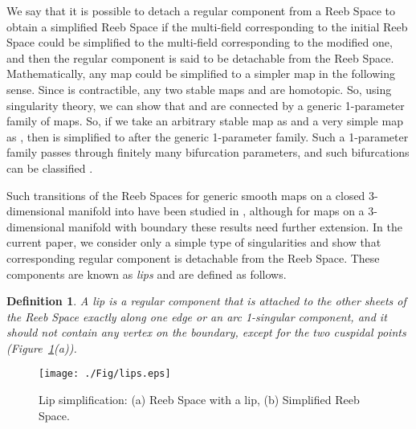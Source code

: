 \documentclass[twocolumn]{article}
\newtheorem{dfn}{Definition}[section]
\begin{document}
We say that it is possible to detach a regular component from a Reeb Space
to obtain a simplified Reeb Space
if the multi-field corresponding to
the initial Reeb Space could be simplified 
to the multi-field corresponding  to the modified one, 
and then the regular component is said to be detachable from the Reeb Space.
Mathematically, any map could be simplified to a simpler map
in the following sense. Since  is contractible,
any two stable maps  and  are homotopic.
So, using singularity theory, we can show that
 and  are connected by a generic 1-parameter
family of maps. So, if we take an arbitrary stable
map as  and a very simple map as , then 
is simplified to  after the generic 1-parameter
family. Such a 1-parameter family passes through
finitely many bifurcation parameters, and such
bifurcations can be classified \cite{Mata-Lorenzo-1989}. 


Such transitions of the Reeb Spaces for generic smooth maps on a
closed 3-dimensional manifold into   have been studied in \cite{Mata-Lorenzo-1989},
although for maps on a 3-dimensional
manifold with boundary these results need further extension. In the current paper, we consider only   
a simple type of singularities and show that corresponding regular
component is detachable from the Reeb Space.
These components are known as \emph{lips}
and are defined as follows.
\begin{dfn}
\label{dfn:lips}
A lip is a regular component that is attached to the other
sheets of the Reeb Space exactly along one edge or an arc 1-singular component,
and it should not contain any vertex on the boundary,
except for the two cuspidal points (Figure~\ref{fig:lips-dfn}(a)).
\end{dfn}
\begin{figure}[h!]
\begin{center}
\texttt{[image: ./Fig/lips.eps]}
\caption{Lip simplification: (a) Reeb Space with a lip, (b) Simplified
  Reeb Space.}
\label{fig:lips-dfn}
\end{center}
\end{figure} 
\end{document}
